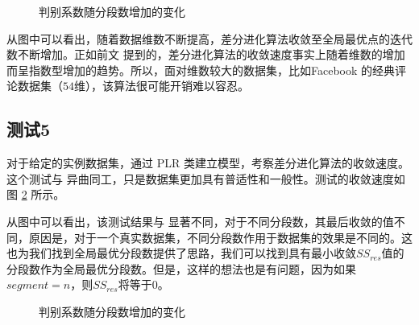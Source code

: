 \begin{figure}[H]
    \caption{判别系数随分段数增加的变化}
    \label{diffe}      
\end{figure}

从图中可以看出，随着数据维数不断提高，差分进化算法收敛至全局最优点的迭代数不断增加。正如前文  提到的，差分进化算法的收敛速度事实上随着维数的增加而呈指数型增加的趋势。所以，面对维数较大的数据集，比如Facebook 的经典评论数据集（$54$维），该算法很可能开销难以容忍。

\subsection{测试5}

对于给定的实例数据集，通过 PLR 类建立模型，考察差分进化算法的收敛速度。这个测试与  异曲同工，只是数据集更加具有普适性和一般性。测试的收敛速度如图 \ref{diffe_real} 所示。

从图中可以看出，该测试结果与  显著不同，对于不同分段数，其最后收敛的值不同，原因是，对于一个真实数据集，不同分段数作用于数据集的效果是不同的。这也为我们找到全局最优分段数提供了思路，我们可以找到具有最小收敛$SS_{res}$值的分段数作为全局最优分段数。但是，这样的想法也是有问题，因为如果$segment = n$，则$SS_{res}$将等于$0$。

\begin{figure}[H]
    \caption{判别系数随分段数增加的变化}
    \label{diffe_real}      
\end{figure}


